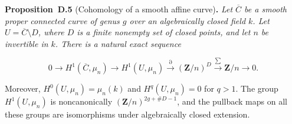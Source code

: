 \documentclass[11pt]{article}
\newenvironment{bpstatement}[2]{\par\addvspace{0.6\baselineskip}\noindent\textbf{#1}#2\textbf{.}\enspace\ignorespaces}
  {\par\addvspace{0.4\baselineskip}}
\newenvironment{bpstatementit}[2]{\begin{bpstatement}{#1}{#2}\itshape\ignorespaces}{\end{bpstatement}}
\begin{document}
\label{bp186}%
\begin{bpstatementit}{Proposition~D.5}{ (Cohomology of a smooth affine curve)}
Let \(\overline C\) be a smooth proper connected curve of genus \(g\) over an algebraically closed field \(k\).  Let \(U=\overline C\setminus D\), where \(D\) is a finite nonempty set of closed points, and let \(n\) be invertible in \(k\).  There is a natural exact sequence

\[
0\longrightarrow H^1(\overline C,\mu_n)
\longrightarrow H^1(U,\mu_n)
\xrightarrow{\partial}(\mathbf Z/n)^D
\xrightarrow{\sum}\mathbf Z/n\longrightarrow0.
\tag{D.1}
\]

Moreover, \(H^0(U,\mu_n)=\mu_n(k)\) and \(H^q(U,\mu_n)=0\) for \(q>1\). The group \(H^1(U,\mu_n)\) is noncanonically \((\mathbf Z/n)^{2g+\#D-1}\), and the pullback maps on all these groups are isomorphisms under algebraically closed extension.
\end{bpstatementit}
\end{document}
